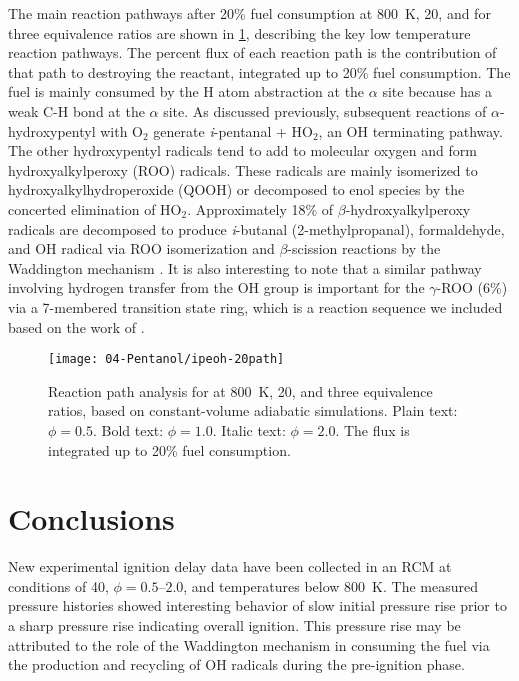 \documentclass[../main.tex]{subfiles}
\begin{document}
The main \iPeOH{} reaction pathways after 20\% fuel consumption at
\SI{800}{\kelvin}, \SI{20}{\atmosphere}, and for three equivalence
ratios are shown in \cref{fig:ipeoh-20path}, describing the key low
temperature reaction pathways. The percent flux of each reaction path
is the contribution of that path to destroying the reactant, integrated
up to 20\% fuel consumption. The fuel is mainly consumed by
the H atom abstraction at the $\alpha$ site because \iPeOH{} has a weak
C-H bond at the $\alpha$ site. As discussed previously, subsequent
reactions of $\alpha$-hydroxypentyl with O$_2$ generate \textit{i}-pentanal
+ HO$_2$, an OH terminating pathway. The other hydroxypentyl radicals tend
to add to molecular oxygen and form hydroxyalkylperoxy (ROO) radicals.
These radicals are mainly isomerized to hydroxyalkylhydroperoxide (QOOH)
or decomposed to enol species by the concerted elimination of HO$_2$. Approximately
18\% of $\beta$-hydroxyalkylperoxy radicals are decomposed to produce
\textit{i}-butanal (2-methylpropanal), formaldehyde, and OH radical via ROO
isomerization and $\beta$-scission reactions by the Waddington mechanism
\cite{Ray1973, Sway1983}. It is also interesting to note that a similar
pathway involving hydrogen transfer from the OH group is
important for the $\gamma$-ROO (6\%) via a 7-membered transition state
ring, which is a reaction sequence we included based on the work
of \textcite{Welz2012}.

\begin{figure}
    \texttt{[image: 04-Pentanol/ipeoh-20path]}
    \caption{Reaction path analysis for \iPeOH{} at \SI{800}{\kelvin},
    \SI{20}{\atmosphere}, and three equivalence ratios, based on
    constant-volume adiabatic simulations. Plain text: $\phi=0.5$.
    Bold text: $\phi=1.0$. Italic text: $\phi=2.0$. The flux is
    integrated up to 20\% fuel consumption.}
    \label{fig:ipeoh-20path}
\end{figure}

\section{Conclusions}
\label{sec:ipeoh-conclusions}

New experimental ignition delay data have been collected in an RCM at
conditions of \SI{40}{\atmosphere}, $\phi=\numrange{0.5}{2.0}$, and
temperatures below \SI{800}{\kelvin}. The measured pressure histories
showed interesting behavior of slow initial pressure rise prior to a
sharp pressure rise indicating overall ignition. This pressure rise
may be attributed to the role of the Waddington mechanism in consuming
the fuel via the production and recycling of OH radicals during the
pre-ignition phase.
\end{document}
